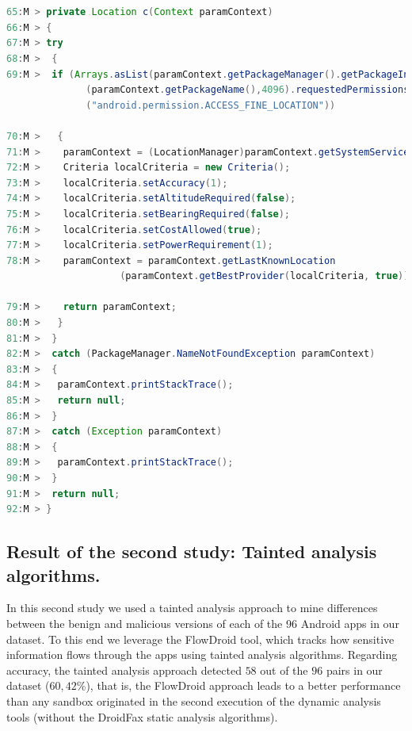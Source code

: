 \begin{lstlisting}[caption={Diffs in the malicious version
      of the class \texttt{net.crazymedia.iad.d.q}
      (app \texttt{ru.qixi.android.smartrabbits})},
      language=Java, basicstyle=\fontsize{8}{6}\selectfont\ttfamily,
      label={lst:c}]


65:M > private Location c(Context paramContext)
66:M > {
67:M > try
68:M >  {
69:M >  if (Arrays.asList(paramContext.getPackageManager().getPackageInfo
              (paramContext.getPackageName(),4096).requestedPermissions).contains
              ("android.permission.ACCESS_FINE_LOCATION"))

70:M >   {
71:M >    paramContext = (LocationManager)paramContext.getSystemService("location");
72:M >    Criteria localCriteria = new Criteria();
73:M >    localCriteria.setAccuracy(1);
74:M >    localCriteria.setAltitudeRequired(false);
75:M >    localCriteria.setBearingRequired(false);
76:M >    localCriteria.setCostAllowed(true);
77:M >    localCriteria.setPowerRequirement(1);
78:M >    paramContext = paramContext.getLastKnownLocation
                    (paramContext.getBestProvider(localCriteria, true));
                    
79:M >    return paramContext;
80:M >   }
81:M >  }
82:M >  catch (PackageManager.NameNotFoundException paramContext)
83:M >  {
84:M >   paramContext.printStackTrace();
85:M >   return null;
86:M >  }
87:M >  catch (Exception paramContext)
88:M >  {
89:M >   paramContext.printStackTrace();
90:M >  }
91:M >  return null;
92:M > }
\end{lstlisting}


\subsection{Result of the second study: Tainted analysis algorithms.}\label{sec:res-ss}

In this second study we used a tainted analysis approach to mine differences between the benign and malicious versions of each of the 96 Android apps in our dataset. To this end we leverage the FlowDroid tool, which tracks how sensitive information flows through the apps using tainted analysis algorithms. Regarding accuracy, the tainted analysis approach detected $58$ out of the $96$ pairs in our dataset ($60,42$\%), that is, the FlowDroid approach leads to a better performance than any sandbox originated in the second execution of the dynamic analysis tools (without the DroidFax static analysis algorithms).


